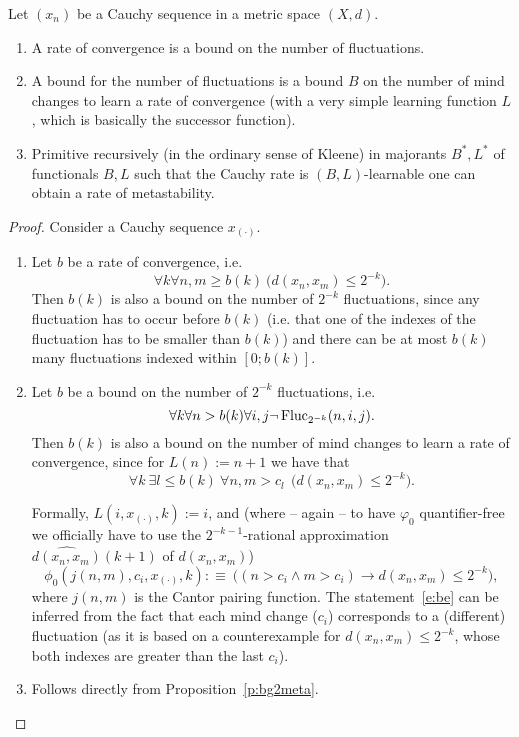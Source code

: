 \begin{prop} \label{prop.hierarchy}
Let $(x_n)$ be a Cauchy sequence in a metric space $(X,d).$ 
\begin{enumerate}
\item A rate of convergence is a bound on the number of fluctuations.
\item A bound for the number of fluctuations is a bound $B$ 
on the number of mind changes to learn a rate of convergence (with a very 
simple learning function $L$, which is basically the successor function).
\item 
Primitive recursively (in the ordinary sense of Kleene) in majorants 
$B^*,L^*$ of functionals $B,L$ such that the Cauchy rate is $(B,L)$-learnable 
one can obtain a rate of metastability. 
\end{enumerate}
\end{prop}
\begin{proof}
Consider a Cauchy sequence $x_{(\cdot)}$.
\begin{enumerate}
\item Let $b$ be a rate of convergence, i.e.
\[ \forall k \forall n,m\geq b(k)\ \big( d(x_n,x_m)\leq 2^{-k}\big). \]
Then $b(k)$ is also a bound on the number of $2^{-k}$ fluctuations, since any fluctuation has to occur before $b(k)$ (i.e. that one of the indexes of the 
fluctuation has to be smaller than $b(k)$) and there can be at most $b(k)$ many fluctuations indexed within $[0;b(k)]$.
\item Let $b$ be a bound on the number of $2^{-k}$ fluctuations, i.e.
\[ \forall k \forall n>b(k) \forall i,j \neg\operatorname{Fluc}_{2^{-k}}(n,i,j). \]
Then $b(k)$ is also a bound on the number of mind changes to learn a rate of convergence, since for 
$L(n):=n+1$ we have that
\[ \forall k\ \exists l\leq b(k)\ \forall n,m>c_l\ \ \big(  d(x_n,x_m)\leq 2^{-k}\big). \tag{BE}\label{e:be}\]
%

Formally, $L(i,x_{(\cdot)},k):=i$, and (where -- again -- to have 
$\varphi_0$ quantifier-free we officially have to use the $2^{-k-1}$-rational 
approximation $\widehat{d(x_n,x_m)}(k+1)$ of $d(x_n,x_m)$) 
\[
\phi_0(j(n,m),c_i,x_{(\cdot)},k):\equiv\ \big((n>c_i \wedge m>c_i) \rightarrow d(x_n,x_m)\leq 2^{-k}\big),
\]
where $j(n,m)$ is the Cantor pairing function.
%
The statement~\eqref{e:be} can be inferred from the fact that each mind change ($c_i$) corresponds to a (different) fluctuation (as it is based on a counterexample for $d(x_n,x_m)\leq 2^{-k}$, whose both indexes are greater than the last $c_i$).
\item Follows directly from Proposition~\ref{p:bg2meta}.
\end{enumerate}
\end{proof}



